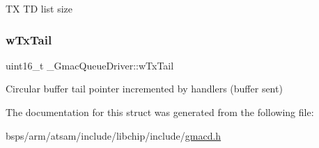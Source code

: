 TX TD list size \mbox{\label{struct__GmacQueueDriver_a3765e4cabe6ed11515b5303b5ae20f4c}} 
\subsubsection{\texorpdfstring{wTxTail}{wTxTail}}
{\footnotesize\ttfamily uint16\+\_\+t \+\_\+\+Gmac\+Queue\+Driver\+::w\+Tx\+Tail}

Circular buffer tail pointer incremented by handlers (buffer sent) 

The documentation for this struct was generated from the following file\+:\begin{DoxyCompactItemize}
\item 
bsps/arm/atsam/include/libchip/include/\mbox{\hyperlink{gmacd_8h}{gmacd.\+h}}\end{DoxyCompactItemize}
